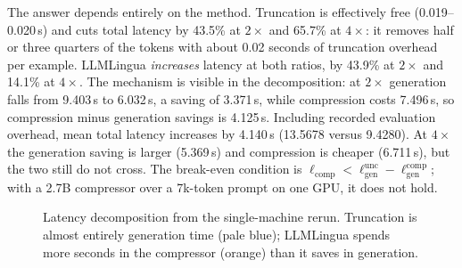 ﻿\documentclass[10pt,a4paper,twocolumn]{article}
\begin{document}
The answer depends entirely on the method. Truncation is effectively free
(0.019--0.020\,s) and cuts total latency by 43.5\% at $2\times$ and 65.7\% at
$4\times$: it removes half or three quarters of the tokens with about 0.02 seconds of truncation overhead per example. LLMLingua \emph{increases} latency at both ratios, by 43.9\% at $2\times$ and
14.1\% at $4\times$. The mechanism is visible in the decomposition: at $2\times$
generation falls from 9.403\,s to 6.032\,s, a saving of 3.371\,s, while
compression costs 7.496\,s, so compression minus generation savings is 4.125\,s. Including recorded evaluation overhead, mean total latency increases by 4.140\,s (13.5678 versus 9.4280). At
$4\times$ the generation saving is larger (5.369\,s) and compression is cheaper
(6.711\,s), but the two still do not cross. The break-even condition is
$\ell_{\text{comp}} < \ell_{\text{gen}}^{\text{unc}} -
\ell_{\text{gen}}^{\text{comp}}$; with a 2.7B compressor over a 7k-token prompt
on one GPU, it does not hold.

\begin{figure}[t]
\centering
{}
\caption{Latency decomposition from the single-machine rerun. Truncation is
almost entirely generation time (pale blue); LLMLingua spends more seconds in the
compressor (orange) than it saves in generation.}
\label{fig:latency}
\end{figure}
\end{document}
